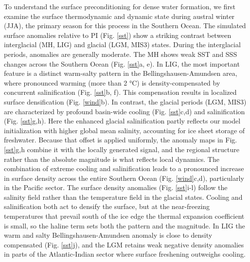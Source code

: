 \documentclass[pdflatex,sn-nature]{sn-jnl}
\begin{document}
To understand the surface preconditioning for dense water formation, we first examine the surface thermodynamic and dynamic state during austral winter (JJA), the primary season for this process in the Southern Ocean. %
The simulated surface anomalies relative to PI (Fig. \ref{sst}) show a striking contrast between interglacial (MH, LIG) and glacial (LGM, MIS3) states. During the interglacial periods, anomalies are generally moderate. The MH shows weak SST and SSS changes across the Southern Ocean (Fig. \ref{sst}a, e). In LIG, the most important feature is a distinct warm-salty pattern in the Bellingshausen-Amundsen area, where pronounced warming (more than 2 °C) is density-compensated by concurrent salinification (Fig. \ref{sst}b, f). This compensation results in localized surface densification (Fig. \ref{wind}b).
In  contrast, the glacial periods (LGM, MIS3) are characterized by profound basin-wide cooling (Fig. \ref{sst}c,d) and salinification (Fig. \ref{sst}g,h). Here the enhanced glacial salinification partly reflects our model initialization with higher global mean salinity, accounting for ice sheet storage of freshwater. Because that offset is applied uniformly, the anomaly maps in Fig. \ref{sst}g,h combine it with the locally generated signal, and the regional structure rather than the absolute magnitude is what reflects local dynamics. The combination of extreme cooling and salinification leads to a pronounced increase in surface density across the entire Southern Ocean (Fig. \ref{wind}c,d), particularly in the Pacific sector. The surface density anomalies (Fig. \ref{sst}i-l) follow the salinity field rather than the temperature field in the glacial states. Cooling and salinification both act to densify the surface, but at the near-freezing temperatures that prevail south of the ice edge the thermal expansion coefficient is small, so the haline term sets both the pattern and the magnitude. In LIG the warm and salty Bellingshausen-Amundsen anomaly is close to density compensated (Fig. \ref{sst}j), and the LGM retains weak negative density anomalies in parts of the Atlantic-Indian sector where surface freshening outweighs cooling.
\end{document}
